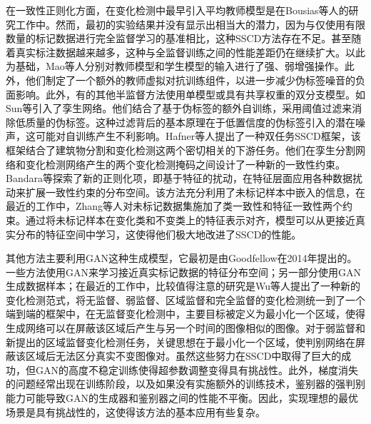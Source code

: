 \documentclass[lang=chs, degree=master, blindreview=false, adobe=false]{yanputhesis}
\begin{document}
在一致性正则化方面，在变化检测中最早引入平均教师模型是在Bousias等人\cite{bousias2021evaluation}的研究工作中。然而，最初的实验结果并没有显示出相当大的潜力，因为与仅使用有限数量的标记数据进行完全监督学习的基准相比，这种SSCD方法存在不足。甚至随着真实标注数据越来越多，这种与全监督训练之间的性能差距仍在继续扩大。以此为基础，Mao等人\cite{mao2023semi}分别对教师模型和学生模型的输入进行了强、弱增强操作。此外，他们制定了一个额外的教师虚拟对抗训练组件，以进一步减少伪标签噪音的负面影响。此外，有的其他半监督方法使用单模型或具有共享权重的双分支模型。如Sun等\cite{sun2022semisanet}引入了孪生网络。他们结合了基于伪标签的额外自训练，采用阈值过滤来消除低质量的伪标签。这种过滤背后的基本原理在于低置信度的伪标签引入的潜在噪声，这可能对自训练产生不利影响。Hafner等人\cite{hafner2022urban}提出了一种双任务SSCD框架，该框架结合了建筑物分割和变化检测这两个密切相关的下游任务。他们在孪生分割网络和变化检测网络产生的两个变化检测掩码之间设计了一种新的一致性约束。Bandara等\cite{bandara2022RCR}探索了新的正则化项，即基于特征的扰动，在特征层面应用各种数据扰动来扩展一致性约束的分布空间。该方法充分利用了未标记样本中嵌入的信息，在最近的工作中，Zhang等人\cite{Zhang2023FPA}对未标记数据集施加了类一致性和特征一致性两个约束。通过将未标记样本在变化类和不变类上的特征表示对齐，模型可以从更接近真实分布的特征空间中学习，这使得他们极大地改进了SSCD的性能。

其他方法主要利用GAN这种生成模型，它最初是由Goodfellow在2014年提出的\cite{goodfellow2014gan}。一些方法使用GAN来学习接近真实标记数据的特征分布空间\cite{peng2021SemiCDNet}\cite{graph2019gan}\cite{nie2022semigan}\cite{yang2022gan}；另一部分使用GAN生成数据样本\cite{li2023multi}\cite{gen_sample_TGRS21}；在最近的工作中，比较值得注意的研究是Wu等人\cite{wu2023fcdgan}提出了一种新的变化检测范式，将无监督、弱监督、区域监督和完全监督的变化检测统一到了一个端到端的框架中，在无监督变化检测中，主要目标被定义为最小化一个区域，使得生成网络可以在屏蔽该区域后产生与另一个时间的图像相似的图像。对于弱监督和新提出的区域监督变化检测任务，关键思想在于最小化一个区域，使判别网络在屏蔽该区域后无法区分真实不变图像对。虽然这些努力在SSCD中取得了巨大的成功，但GAN的高度不稳定训练使得超参数调整变得具有挑战性。此外，梯度消失的问题经常出现在训练阶段，以及如果没有实施额外的训练技术，鉴别器的强判别能力可能导致GAN的生成器和鉴别器之间的性能不平衡。因此，实现理想的最优场景是具有挑战性的，这使得该方法的基本应用有些复杂。
\end{document}
